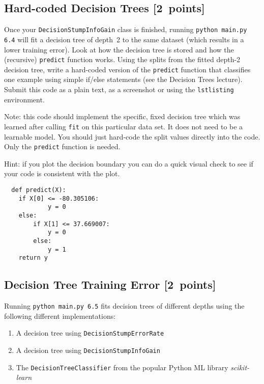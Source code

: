 \documentclass{article}
\newcommand{\blu}[1]{{\textcolor{blu}{#1}}}
\let\ask\blu
\newcommand\pts[1]{\textcolor{pointscolour}{[#1~points]}}
\begin{document}
  

  \subsection{Hard-coded Decision Trees \pts{2}}

  Once your \texttt{DecisionStumpInfoGain} class is finished, running \texttt{python main.py 6.4} will fit
  a decision tree of depth~2 to the same dataset (which results in a lower training error).
  Look at how the decision tree is stored and how the (recursive) \texttt{predict} function works.
  \ask{Using the splits from the fitted depth-2 decision tree, write a hard-coded version of the \texttt{predict}
  function that classifies one example using simple if/else statements
  (see the Decision Trees lecture). Submit this code as a plain text, as a screenshot or using the \texttt{lstlisting} environment.}

  Note: this code should implement the specific, fixed decision tree
  which was learned after calling \texttt{fit} on this particular data set. It does not need to be a learnable model.
  You should just hard-code the split values directly into the code.
  Only the \texttt{predict} function is needed.

  Hint: if you plot the decision boundary you can do a quick visual check to see if your code is consistent with the plot.

  \begin{verbatim}
  def predict(X):
    if X[0] <= -80.305106:
            y = 0
    else:
        if X[1] <= 37.669007:
            y = 0
        else:
            y = 1
    return y
   \end{verbatim}



  \subsection{Decision Tree Training Error \pts{2}}

  Running \texttt{python main.py 6.5} fits decision trees of different depths using the following different implementations:
  \begin{enumerate}
  \item A decision tree using \texttt{DecisionStumpErrorRate}
  \item A decision tree using \texttt{DecisionStumpInfoGain}
  \item The \texttt{DecisionTreeClassifier} from the popular Python ML library \emph{scikit-learn}
  \end{enumerate}
\end{document}
